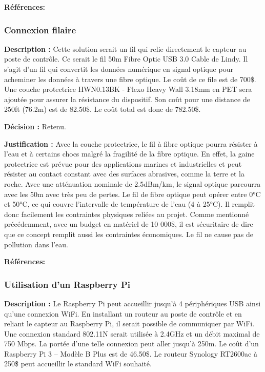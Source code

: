 \textbf{Références:} \cite{GoPro_Specs} \cite{GoPro_Waterproof} \cite{GoFishCam} \cite{iPhone7}

\subsubsection{Connexion filaire}
\textbf{Description :} Cette solution serait un fil qui relie directement le capteur au poste de contrôle. Ce serait le fil 50m Fibre Optic USB 3.0 Cable de Lindy. Il s'agit d'un fil qui convertit les données numérique en signal optique pour acheminer les données à travers une fibre optique. Le coût de ce file est de 700\$. Une couche protectrice HWN0.13BK - Flexo Heavy Wall 3.18mm en PET sera ajoutée pour assurer la résistance du dispositif. Son coût pour une distance de 250ft (76.2m) est de 82.50\$. Le coût total est donc de 782.50\$.
 
\textbf{Décision :} Retenu.
 
\textbf{Justification :} Avec la couche protectrice, le fil à fibre optique pourra résister à l'eau et à certains chocs malgré la fragilité de la fibre optique. En effet, la gaine protectrice est prévue pour des applications marines et industrielles et peut résister au contact constant avec des surfaces abrasives, comme la terre et la roche. Avec une atténuation nominale de 2.5dBm/km, le signal optique parcourra avec les 50m avec très peu de pertes. Le fil de fibre optique peut opérer entre 0°C et 50°C, ce qui couvre l'intervalle de température de l'eau (4 à 25°C). Il remplit donc facilement les contraintes physiques reliées au projet. Comme mentionné précédemment, avec un budget en matériel de 10 000\$, il est sécuritaire de dire que ce concept remplit aussi les contraintes économiques. Le fil ne cause pas de pollution dans l'eau.

\textbf{Références:} \cite{usb_50m} \cite{usb_standard_50m} \cite{Techflex}

\subsubsection{Utilisation d'un Raspberry Pi}
\textbf{Description :} Le Raspberry Pi peut accueillir jusqu'à 4 périphériques USB ainsi qu'une connexion WiFi. En installant un routeur au poste de contrôle et en reliant le capteur au Raspberry Pi, il serait possible de communiquer par WiFi. Une connexion standard 802.11N serait utilisée à 2.4GHz et un débit maximal de 750 Mbps. La portée d'une telle connexion peut aller jusqu'à 250m. Le coût d'un Raspberry Pi 3 – Modèle B Plus est de 46.50\$. Le routeur Synology RT2600ac à 250\$ peut accueillir le standard WiFi souhaité.


